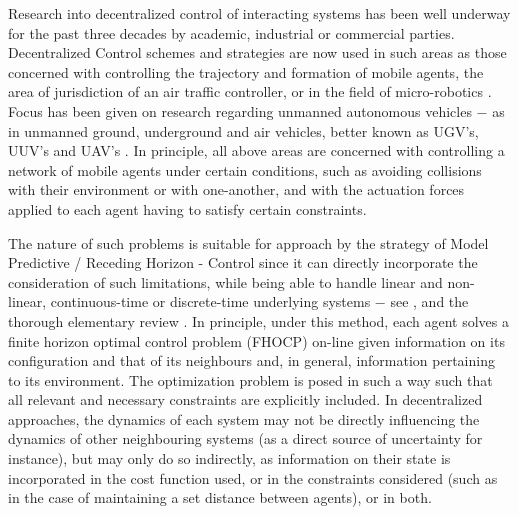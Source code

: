Research into decentralized control of interacting systems has been well
underway for the past three decades by academic, industrial or commercial
parties. Decentralized Control schemes and strategies are now used in such areas
as those concerned with controlling the trajectory and formation of mobile
agents, the area of jurisdiction of an air traffic controller\cite{4459797}, or
in the field of micro-robotics \cite{iswarm}\cite{micron}. Focus has been given
on research regarding unmanned autonomous vehicles $-$ as in unmanned ground,
underground and air vehicles, better known as UGV's, UUV's and
UAV's \cite{1429425}\cite{Dunbar2006549}\cite{4389042}\cite{1470732}.
In principle, all above areas are concerned with controlling a network of
mobile agents under certain conditions, such as avoiding collisions with their
environment or with one-another, and with the actuation forces applied to each
agent having to satisfy certain constraints.

The nature of such problems is suitable for approach by the strategy of
Model Predictive / Receding Horizon - Control since it can directly incorporate
the consideration of such limitations, while being able to handle linear and
non-linear, continuous-time or discrete-time underlying systems $-$ see
\cite{FINDEISEN2003190}\cite{262032}\cite{grune2016nonlinear}, and the thorough
elementary review \cite{Mayne2000789}. In principle, under this method, each
agent solves a finite horizon optimal control problem (FHOCP) on-line given
information on its configuration and that of its neighbours and, in general,
information pertaining to its environment. The optimization problem is posed in
such a way such that all relevant and necessary constraints are explicitly
included. In decentralized approaches, the dynamics of each system may not be
directly influencing the dynamics of other neighbouring systems (as a direct
source of uncertainty for instance), but may only do so indirectly, as
information on their state is incorporated in the cost function used, or in the
constraints considered (such as in the case of maintaining a set distance
between agents), or in both.

